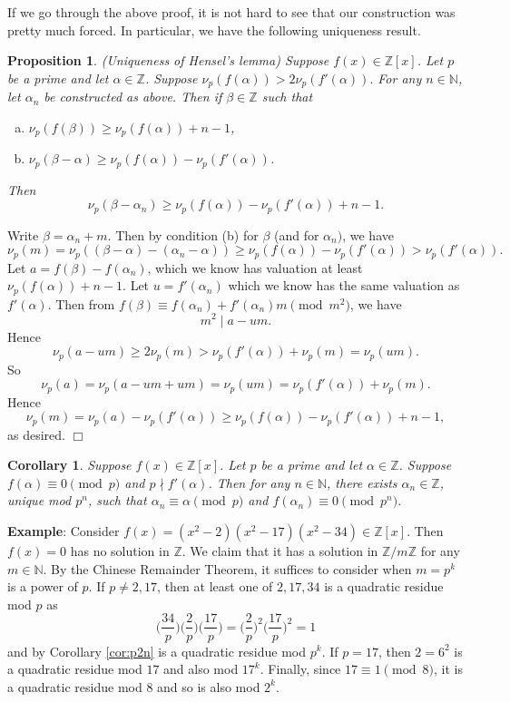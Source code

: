 \documentclass{article}
\def\Z{{\mathbb Z}}
\def\N{{\mathbb N}}
\def\Z{{\mathbb Z}}
\newtheorem{cor}[subsection]{Corollary}
\newtheorem{proposition}[subsection]{Proposition}
\newenvironment{proof}{\noindent {\bf Proof:}}{$\Box$ \vspace{2 ex}}
\renewcommand{\lg}[2]{\Big(\frac{#1}{#2}\Big)}
\begin{document}
If we go through the above proof, it is not hard to see that our construction was pretty much forced. In particular, we have the following uniqueness result.

\begin{proposition}
    (Uniqueness of Hensel's lemma) Suppose $f(x)\in\Z[x]$. Let $p$ be a prime and let $\alpha\in \Z$. Suppose $\nu_p(f(\alpha)) > 2\nu_p(f'(\alpha)).$ For any $n\in\N$, let $\alpha_n$ be constructed as above. Then if $\beta\in\Z$ such that
    \begin{enumerate}[(a)]
        \item $\nu_p(f(\beta)) \geq \nu_p(f(\alpha)) + n-1$,
        \item $\nu_p(\beta-\alpha) \geq \nu_p(f(\alpha))-\nu_p(f'(\alpha))$.
    \end{enumerate} 
    Then $$\nu_p(\beta-\alpha_n)\geq \nu_p(f(\alpha)) - \nu_p(f'(\alpha)) + n - 1.$$
\end{proposition}

\begin{proof}
    Write $\beta = \alpha_n + m$. Then by condition (b) for $\beta$ (and for $\alpha_n)$, we have
    $$\nu_p(m)  = \nu_p((\beta-\alpha)-(\alpha_n-\alpha))\geq \nu_p(f(\alpha)) - \nu_p(f'(\alpha)) > \nu_p(f'(\alpha)).$$ %
Let $a = f(\beta) - f(\alpha_n)$, which we know has valuation at least $\nu_p(f(\alpha)) + n-1$. Let $u = f'(\alpha_n)$ which we know has the same valuation as $f'(\alpha)$. Then from $f(\beta) \equiv f(\alpha_n) + f'(\alpha_n)m \pmod{m^2}$, we have $$m^2\mid a - um.$$
Hence $$\nu_p(a - um) \geq 2\nu_p(m) > \nu_p(f'(\alpha)) + \nu_p(m) = \nu_p(um).$$ So
$$\nu_p(a) = \nu_p(a - um + um) = \nu_p(um) = \nu_p(f'(\alpha)) + \nu_p(m).$$
Hence
$$\nu_p(m) = \nu_p(a) - \nu_p(f'(\alpha)) \geq \nu_p(f(\alpha)) - \nu_p(f'(\alpha)) + n - 1,$$
as desired.
\end{proof}

\begin{cor}
    Suppose $f(x)\in\Z[x]$. Let $p$ be a prime and let $\alpha\in \Z$. Suppose $f(\alpha)\equiv 0\pmod{p}$ and $p\nmid f'(\alpha)$. Then for any $n\in\N$, there exists $\alpha_n\in\Z$, unique mod $p^n$, such that $\alpha_n\equiv \alpha\pmod{p}$ and $f(\alpha_n)\equiv 0\pmod{p^n}.$
\end{cor}

\vspace{5pt}
\noindent\textbf{Example}: Consider $f(x) = (x^2 - 2)(x^2 - 17)(x^2 - 34)\in\Z[x]$. Then $f(x) = 0$ has no solution in $\Z$. We claim that it has a solution in $\Z/m\Z$ for any $m\in\N$. By the Chinese Remainder Theorem, it suffices to consider when $m = p^k$ is a power of $p$. If $p\neq 2,17$, then at least one of $2, 17, 34$ is a quadratic residue mod $p$ as
$$\lg{34}{p}\lg{2}{p}\lg{17}{p} = \lg{2}{p}^2\lg{17}{p}^2 = 1$$
and by Corollary \ref{cor:p2n} is a quadratic residue mod $p^k$. If $p = 17$, then $2 = 6^2$ is a quadratic residue mod $17$ and also mod $17^k$. Finally, since $17\equiv 1\pmod{8}$, it is a quadratic residue mod $8$ and so is also mod $2^k$.
\end{document}
